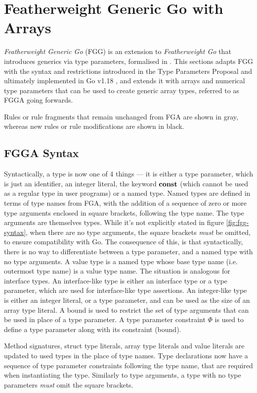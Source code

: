 \section{Featherweight Generic Go with Arrays}

\emph{Featherweight Generic Go} (FGG) is an extension to \emph{Featherweight Go}
that introduces generics via type parameters, formalised in \autocite{fg}. This
sections adapts FGG with the syntax and restrictions introduced in the Type
Parameters Proposal and ultimately implemented in Go v1.18
\autocite{genericsProposal}, and extends it with arrays and numerical type
parameters that can be used to create generic array types, referred to as FGGA
going forwards.

Rules or rule fragments that remain unchanged from FGA are shown in gray,
whereas new rules or rule modifications are shown in black.

\subsection{FGGA Syntax}

Syntactically, a type is now one of 4 things --- it is either a type parameter,
which is just an identifier, an integer literal, the keyword $\texttt{\bf const}$ (which
cannot be used as a regular type in user programs) or a named type. Named types
are defined in terms of type names from FGA, with the addition of a sequence of
zero or more type arguments enclosed in square brackets, following the type
name. The type arguments are themselves types. While it's not explicitly stated
in figure \ref{fig:fgg-syntax}, when there are no type arguments, the square
brackets \emph{must} be omitted, to ensure compatibility with Go. The
consequence of this, is that syntactically, there is no way to differentiate
between a type parameter, and a named type with no type arguments. A value type
is a named type whose base type name (i.e. outermost type name) is a value type
name. The situation is analogous for interface types. An interface-like type is
either an interface type or a type parameter, which are used for interface-like
type assertions. An integer-like type is either an integer literal, or a type
parameter, and can be used as the size of an array type literal. A bound is used
to restrict the set of type arguments that can be used in place of a type
parameter. A type parameter constraint $\Phi$ is used to define a type parameter
along with its constraint (bound).

Method signatures, struct type literals, array type literals and value literals
are updated to used types in the place of type names. Type declarations now have
a sequence of type parameter constraints following the type name, that are
required when instantiating the type. Similarly to type arguments, a type with
no type parameters \emph{must} omit the square brackets.

